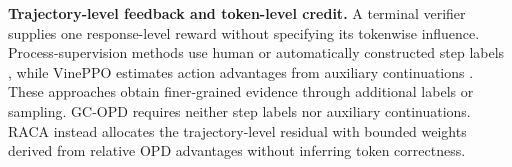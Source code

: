 \textbf{Trajectory-level feedback and token-level credit.}
A terminal verifier supplies one response-level reward without specifying its tokenwise influence. Process-supervision methods use human or automatically constructed step labels \citep{lightman2024let,wang2024math}, while VinePPO estimates action advantages from auxiliary continuations \citep{pmlr-v267-kazemnejad25a}. These approaches obtain finer-grained evidence through additional labels or sampling. GC-OPD requires neither step labels nor auxiliary continuations. RACA instead allocates the trajectory-level residual with bounded weights derived from relative OPD advantages without inferring token correctness.
